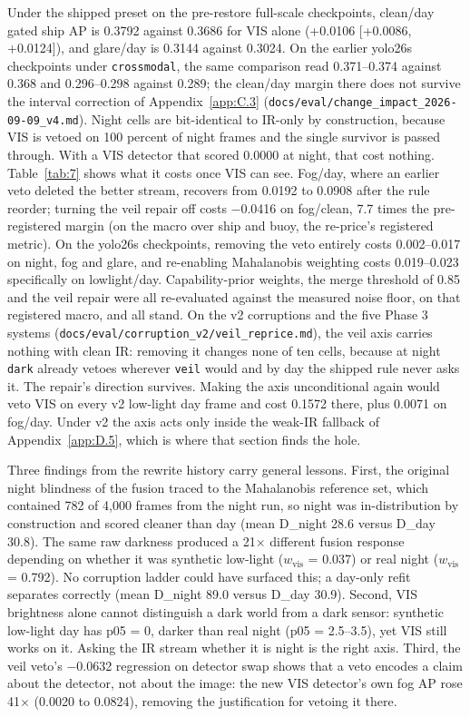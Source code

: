 \documentclass[journal,onecolumn]{IEEEtran}
\begin{document}
Under the shipped preset on the pre-restore full-scale checkpoints, clean/day gated ship AP is 0.3792 against 0.3686 for VIS alone (+0.0106 [+0.0086, +0.0124]), and glare/day is 0.3144 against 0.3024. On the earlier yolo26s checkpoints under \texttt{crossmodal}, the same comparison read 0.371--0.374 against 0.368 and 0.296--0.298 against 0.289; the clean/day margin there does not survive the interval correction of Appendix~\ref{app:C.3} (\texttt{docs/\allowbreak{}eval/\allowbreak{}change\_\allowbreak{}impact\_\allowbreak{}2026-\allowbreak{}09-\allowbreak{}09\_\allowbreak{}v4.md}). Night cells are bit-identical to IR-only by construction, because VIS is vetoed on 100 percent of night frames and the single survivor is passed through. With a VIS detector that scored 0.0000 at night, that cost nothing. Table~\ref{tab:7} shows what it costs once VIS can see. Fog/day, where an earlier veto deleted the better stream, recovers from 0.0192 to 0.0908 after the rule reorder; turning the veil repair off costs $-$0.0416 on fog/clean, 7.7 times the pre-registered margin (on the macro over ship and buoy, the re-price's registered metric). On the yolo26s checkpoints, removing the veto entirely costs 0.002--0.017 on night, fog and glare, and re-enabling Mahalanobis weighting costs 0.019--0.023 specifically on lowlight/day. Capability-prior weights, the merge threshold of 0.85 and the veil repair were all re-evaluated against the measured noise floor, on that registered macro, and all stand. On the v2 corruptions and the five Phase 3 systems (\texttt{docs/\allowbreak{}eval/\allowbreak{}corruption\_\allowbreak{}v2/\allowbreak{}veil\_\allowbreak{}reprice.md}), the veil axis carries nothing with clean IR: removing it changes none of ten cells, because at night \texttt{dark} already vetoes wherever \texttt{veil} would and by day the shipped rule never asks it. The repair's direction survives. Making the axis unconditional again would veto VIS on every v2 low-light day frame and cost 0.1572 there, plus 0.0071 on fog/day. Under v2 the axis acts only inside the weak-IR fallback of Appendix~\ref{app:D.5}, which is where that section finds the hole.

Three findings from the rewrite history carry general lessons. First, the original night blindness of the fusion traced to the Mahalanobis reference set, which contained 782 of 4,000 frames from the night run, so night was in-distribution by construction and scored cleaner than day (mean D\_night 28.6 versus D\_day 30.8). The same raw darkness produced a 21$\times$ different fusion response depending on whether it was synthetic low-light ($w_{\mathrm{vis}}$ = 0.037) or real night ($w_{\mathrm{vis}}$ = 0.792). No corruption ladder could have surfaced this; a day-only refit separates correctly (mean D\_night 89.0 versus D\_day 30.9). Second, VIS brightness alone cannot distinguish a dark world from a dark sensor: synthetic low-light day has p05 = 0, darker than real night (p05 = 2.5--3.5), yet VIS still works on it. Asking the IR stream whether it is night is the right axis. Third, the veil veto's $-$0.0632 regression on detector swap shows that a veto encodes a claim about the detector, not about the image: the new VIS detector's own fog AP rose 41$\times$ (0.0020 to 0.0824), removing the justification for vetoing it there.
\end{document}
